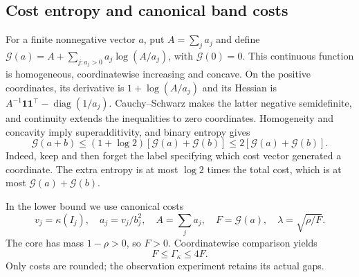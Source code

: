 \subsection{Cost entropy and canonical band costs}\label{fg:sec:entropy-preliminaries}
For a finite nonnegative vector $a$, put $A=\sum_j a_j$ and define
$\mathcal G(a)=A+\sum_{j:a_j>0}a_j\log(A/a_j)$, with
$\mathcal G(0)=0$. This continuous function is homogeneous,
coordinatewise increasing and concave. On the positive coordinates,
its derivative is $1+\log(A/a_j)$ and its Hessian is
$A^{-1}\mathbf1\mathbf1^\top-\operatorname{diag}(1/a_j)$.
Cauchy--Schwarz makes the latter negative semidefinite, and continuity
extends the inequalities to zero coordinates. Homogeneity and concavity
imply superadditivity, and binary entropy gives
\begin{equation}\label{fg:eq:binary-mixture}
 \mathcal G(a+b)\le(1+\log2)[\mathcal G(a)+\mathcal G(b)]
                 \le2[\mathcal G(a)+\mathcal G(b)].
\end{equation}
Indeed, keep and then forget the label specifying which cost vector
generated a coordinate. The extra entropy is at most $\log2$ times
the total cost, which is at most $\mathcal G(a)+\mathcal G(b)$.

In the lower bound we use canonical costs
\[
 v_j=\kappa(I_j),\quad a_j=v_j/b_j^2,\quad A=\sum_j a_j,
 \quad F=\mathcal G(a),\quad \lambda=\sqrt{\rho/F}.
\]
The core has mass $1-\rho>0$, so $F>0$. Coordinatewise comparison yields
\begin{equation}\label{fg:eq:canonical-core}
                      F\le\Gamma_\kappa\le4F.
\end{equation}
Only costs are rounded; the observation experiment retains its actual gaps.
